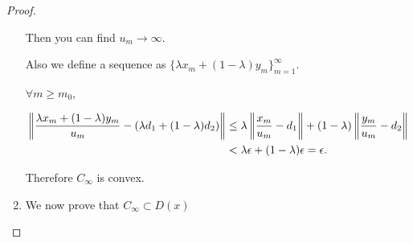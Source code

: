 \documentclass[a4paper,11pt]{jsarticle}
\begin{document}
\begin{proof}
\begin{enumerate}[label=\roman*,align=CenterWithParen]
    Then you can find $u_m \rightarrow \infty$.

    Also we define a sequence as $\{ \lambda x_m + (1 - \lambda) y_m \}_{m=1}^{\infty}$.

    $\forall m \geq m_0$,

    \begin{equation}
      \begin{split}
        \left\lVert \frac{\lambda x_m + (1 - \lambda) y_m}{u_m} - (\lambda d_1 + (1 - \lambda) d_2) \right\rVert &\leq \lambda \left\lVert \frac{x_m}{u_m} - d_1 \right\rVert + (1 - \lambda) \left\lVert \frac{y_m}{u_m} - d_2 \right\rVert \\
        &< \lambda \epsilon + (1 - \lambda) \epsilon = \epsilon. \notag
      \end{split}
    \end{equation}

    Therefore $C_{\infty}$ is convex.

    \item We now prove that $C_{\infty} \subset D(x)$

  \end{enumerate}
\end{proof}
\end{document}
